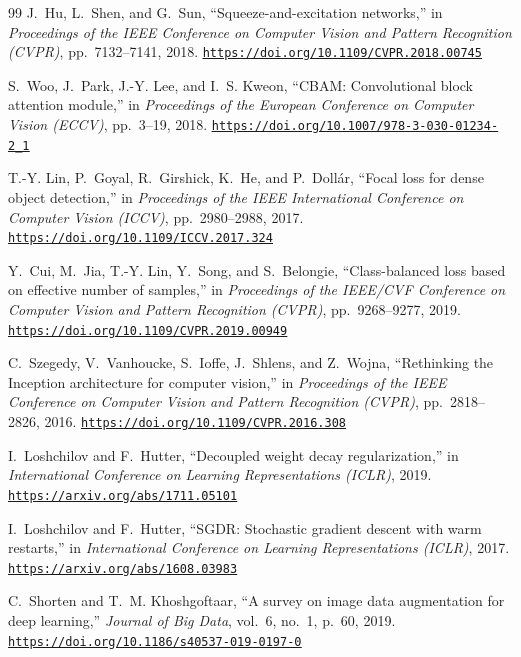 \documentclass[11pt,a4paper]{article}
\newcommand{\paperurl}[1]{\href{#1}{\underline{\nolinkurl{#1}}}}
\begin{document}
\begin{thebibliography}{99}
J.~Hu, L.~Shen, and G.~Sun,
\newblock ``Squeeze-and-excitation networks,''
\newblock in \emph{Proceedings of the IEEE Conference on Computer Vision and Pattern Recognition (CVPR)}, pp.~7132--7141, 2018.
\newblock \paperurl{https://doi.org/10.1109/CVPR.2018.00745}

S.~Woo, J.~Park, J.-Y. Lee, and I.~S. Kweon,
\newblock ``CBAM: Convolutional block attention module,''
\newblock in \emph{Proceedings of the European Conference on Computer Vision (ECCV)}, pp.~3--19, 2018.
\newblock \paperurl{https://doi.org/10.1007/978-3-030-01234-2_1}

T.-Y. Lin, P.~Goyal, R.~Girshick, K.~He, and P.~Doll\'ar,
\newblock ``Focal loss for dense object detection,''
\newblock in \emph{Proceedings of the IEEE International Conference on Computer Vision (ICCV)}, pp.~2980--2988, 2017.
\newblock \paperurl{https://doi.org/10.1109/ICCV.2017.324}

Y.~Cui, M.~Jia, T.-Y. Lin, Y.~Song, and S.~Belongie,
\newblock ``Class-balanced loss based on effective number of samples,''
\newblock in \emph{Proceedings of the IEEE/CVF Conference on Computer Vision and Pattern Recognition (CVPR)}, pp.~9268--9277, 2019.
\newblock \paperurl{https://doi.org/10.1109/CVPR.2019.00949}

C.~Szegedy, V.~Vanhoucke, S.~Ioffe, J.~Shlens, and Z.~Wojna,
\newblock ``Rethinking the Inception architecture for computer vision,''
\newblock in \emph{Proceedings of the IEEE Conference on Computer Vision and Pattern Recognition (CVPR)}, pp.~2818--2826, 2016.
\newblock \paperurl{https://doi.org/10.1109/CVPR.2016.308}

I.~Loshchilov and F.~Hutter,
\newblock ``Decoupled weight decay regularization,''
\newblock in \emph{International Conference on Learning Representations (ICLR)}, 2019.
\newblock \paperurl{https://arxiv.org/abs/1711.05101}

I.~Loshchilov and F.~Hutter,
\newblock ``SGDR: Stochastic gradient descent with warm restarts,''
\newblock in \emph{International Conference on Learning Representations (ICLR)}, 2017.
\newblock \paperurl{https://arxiv.org/abs/1608.03983}

C.~Shorten and T.~M. Khoshgoftaar,
\newblock ``A survey on image data augmentation for deep learning,''
\newblock \emph{Journal of Big Data}, vol.~6, no.~1, p.~60, 2019.
\newblock \paperurl{https://doi.org/10.1186/s40537-019-0197-0}


\end{thebibliography}
\end{document}
